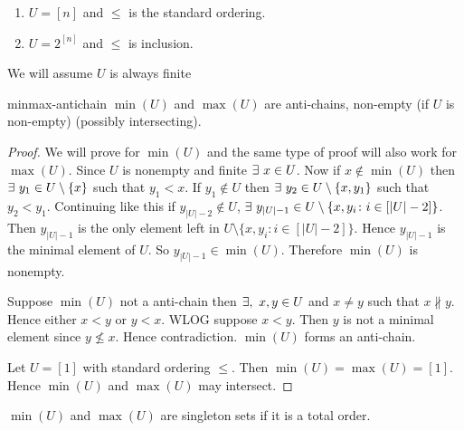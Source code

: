\documentclass[twoside]{article}
\begin{document}
\begin{Example}{}{}
	\begin{enumerate}[label=(\alph*)]
		\item $U=[n]$ and $\leq $ is the standard ordering.
		\item $U=2^{[n]}$ and $\leq $ is inclusion. 
	\end{enumerate}
\end{Example}


\begin{assumption*}
	We will assume $U$ is always finite
\end{assumption*}
\begin{lemma}{}{minmax-antichain}
	$\min (U)$ and $\max{(U)}$ are anti-chains, non-empty (if $U$ is non-empty) (possibly intersecting).
\end{lemma}
\begin{proof}
	We will prove for $\min(U)$ and the same type of proof will also work for $\max(U)$. Since $U$ is nonempty and finite $\exists \ x\in U$. Now if $x\notin \min(U)$ then $\exists\ y_1\in U\setminus\{x\}$ such that $y_1<x$. If $y_1\notin U$ then $\exists\ y_2\in U\setminus\{x,y_1\}$ such that $y_2<y_1$. Continuing like this if $y_{|U|-2}\notin U$, $\exists\ y_{|U|-1}\in U\setminus\{x,y_i\colon i\in[|U|-2]\}$. Then $y_{|U|-1}$ is the only element left in $U\setminus\{x,y_i\colon i\in[|U|-2]\}$. Hence $y_{|U|-1}$ is the minimal element of $U$. So $y_{|U|-1}\in \min(U)$. Therefore $\min(U)$ is nonempty.
	
	Suppose $\min(U)$  not a anti-chain then $\exists,\ x,y\in U$ and $x\neq y$ such that $x\nparallel
	y$. Hence either $x<y$ or $y<x$. WLOG suppose $x<y$. Then $y$ is not a minimal element since $y\not\leq x$. Hence contradiction. $\min(U)$ forms an anti-chain.
	
	Let $U=[1]$ with standard ordering $\leq$. Then $\min(U)=\max(U)=[1]$. Hence $\min(U)$ and $\max(U)$ may intersect. 
\end{proof}
\begin{observation*}
	$\min(U)$ and $\max(U)$ are singleton sets  if it is a total order. 
\end{observation*}
\end{document}
